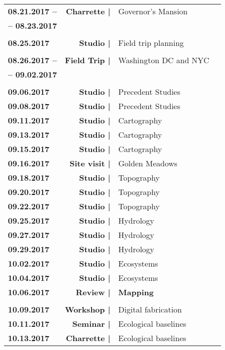\documentclass[11pt,article,oneside]{memoir}
\begin{document}
\begin{table}[H]
\small
\begin{tabular}{l r @{\hskip 0.1cm} l @{\hskip 0.5cm} l}
%
\textbf{08.21.2017 --} & \textbf{Charrette |} & Governor's Mansion\\
\textbf{-- 08.23.2017}\\
%
\\
%
\textbf{08.25.2017} & \textbf{Studio |} & Field trip planning\\
%
\\
%
\textbf{08.26.2017 -- } & \textbf{Field Trip |} & Washington DC and NYC\\
\textbf{ -- 09.02.2017}\\
%
\\
%
\textbf{09.06.2017} & \textbf{Studio |} & Precedent Studies\\
\textbf{09.08.2017} & \textbf{Studio |} & Precedent Studies\\
%
\textbf{09.11.2017} & \textbf{Studio |} & Cartography\\
\textbf{09.13.2017} & \textbf{Studio |} & Cartography\\
\textbf{09.15.2017} & \textbf{Studio |} & Cartography\\
%
\textbf{09.16.2017} & \textbf{Site visit |} & Golden Meadows\\
%
\textbf{09.18.2017} & \textbf{Studio |} & Topography\\
\textbf{09.20.2017} & \textbf{Studio |} & Topography\\
\textbf{09.22.2017} & \textbf{Studio |} & Topography\\
%
\textbf{09.25.2017} & \textbf{Studio |} & Hydrology\\
\textbf{09.27.2017} & \textbf{Studio |} & Hydrology\\
\textbf{09.29.2017} & \textbf{Studio |} & Hydrology\\
%
\textbf{10.02.2017} & \textbf{Studio |} & Ecosystems\\
\textbf{10.04.2017} & \textbf{Studio |} & Ecosystems\\
\textbf{10.06.2017} & \textbf{Review |} & \textbf{Mapping}\\
%
\\
%
\textbf{10.09.2017} & \textbf{Workshop |} & Digital fabrication\\
\textbf{10.11.2017} & \textbf{Seminar |} & Ecological baselines\\
\textbf{10.13.2017} & \textbf{Charrette |} & Ecological baselines\\ %

\end{tabular}
\end{table}
\end{document}
